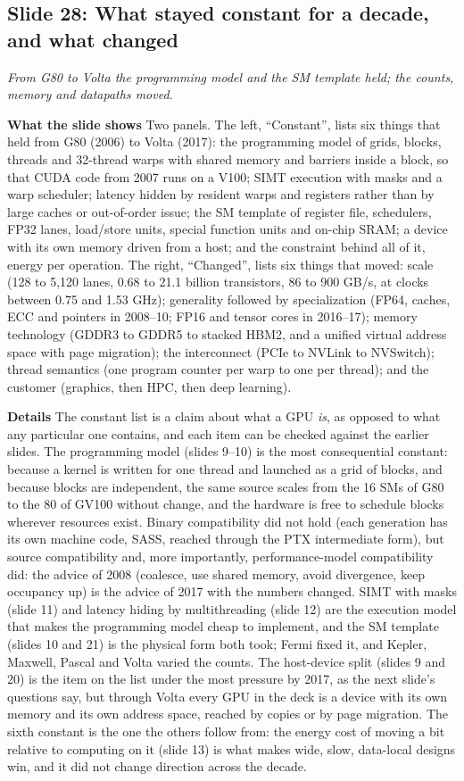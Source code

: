 \documentclass[11pt,letterpaper]{article}
\newcommand{\slide}[3]{%
  \subsection[Slide #1: #2]{Slide #1: #2}%
  {\color{muted}\itshape #3\par}\medskip}
\newcommand{\para}[1]{\medskip\noindent\textbf{#1}\quad}
\begin{document}
\slide{28}{What stayed constant for a decade, and what changed}{From G80 to Volta the programming model and the SM template held; the counts, memory and datapaths moved.}

\para{What the slide shows} Two panels. The left, ``Constant'', lists six things that held from G80 (2006) to Volta (2017): the programming model of grids, blocks, threads and 32-thread warps with shared memory and barriers inside a block, so that CUDA code from 2007 runs on a V100; SIMT execution with masks and a warp scheduler; latency hidden by resident warps and registers rather than by large caches or out-of-order issue; the SM template of register file, schedulers, FP32 lanes, load/store units, special function units and on-chip SRAM; a device with its own memory driven from a host; and the constraint behind all of it, energy per operation. The right, ``Changed'', lists six things that moved: scale (128 to 5,120 lanes, 0.68 to 21.1 billion transistors, 86 to 900 GB/s, at clocks between 0.75 and 1.53 GHz); generality followed by specialization (FP64, caches, ECC and pointers in 2008--10; FP16 and tensor cores in 2016--17); memory technology (GDDR3 to GDDR5 to stacked HBM2, and a unified virtual address space with page migration); the interconnect (PCIe to NVLink to NVSwitch); thread semantics (one program counter per warp to one per thread); and the customer (graphics, then HPC, then deep learning).

\para{Details} The constant list is a claim about what a GPU \emph{is}, as opposed to what any particular one contains, and each item can be checked against the earlier slides. The programming model (slides 9--10) is the most consequential constant: because a kernel is written for one thread and launched as a grid of blocks, and because blocks are independent, the same source scales from the 16 SMs of G80 to the 80 of GV100 without change, and the hardware is free to schedule blocks wherever resources exist. Binary compatibility did not hold (each generation has its own machine code, SASS, reached through the PTX intermediate form), but source compatibility and, more importantly, performance-model compatibility did: the advice of 2008 (coalesce, use shared memory, avoid divergence, keep occupancy up) is the advice of 2017 with the numbers changed. SIMT with masks (slide 11) and latency hiding by multithreading (slide 12) are the execution model that makes the programming model cheap to implement, and the SM template (slides 10 and 21) is the physical form both took; Fermi fixed it, and Kepler, Maxwell, Pascal and Volta varied the counts. The host-device split (slides 9 and 20) is the item on the list under the most pressure by 2017, as the next slide's questions say, but through Volta every GPU in the deck is a device with its own memory and its own address space, reached by copies or by page migration. The sixth constant is the one the others follow from: the energy cost of moving a bit relative to computing on it (slide 13) is what makes wide, slow, data-local designs win, and it did not change direction across the decade.
\end{document}
